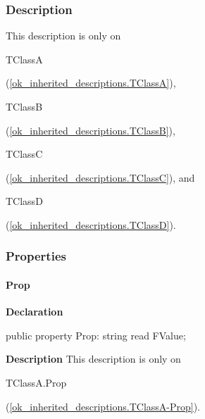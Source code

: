 \documentclass{report}
\begin{document}
\subsubsection*{\large{\textbf{Description}}\normalsize\hspace{1ex}\hfill}
This description is only on \begin{ttfamily}TClassA\end{ttfamily}(\ref{ok_inherited_descriptions.TClassA}), \begin{ttfamily}TClassB\end{ttfamily}(\ref{ok_inherited_descriptions.TClassB}), \begin{ttfamily}TClassC\end{ttfamily}(\ref{ok_inherited_descriptions.TClassC}), and \begin{ttfamily}TClassD\end{ttfamily}(\ref{ok_inherited_descriptions.TClassD}).\subsubsection*{\large{\textbf{Properties}}\normalsize\hspace{1ex}\hfill}
\paragraph*{Prop}\hspace*{\fill}

\begin{list}{}{
\setlength{\itemindent}{0cm}
\setlength{\listparindent}{0cm}
\setlength{\leftmargin}{\evensidemargin}
\addtolength{\leftmargin}{\tmplength}
\settowidth{\labelsep}{X}
\addtolength{\leftmargin}{\labelsep}
\setlength{\labelwidth}{\tmplength}
}
\begin{flushleft}
\item[\textbf{Declaration}\hfill]
\begin{ttfamily}
public property Prop: string read FValue;\end{ttfamily}


\end{flushleft}
\par
\item[\textbf{Description}]
This description is only on \begin{ttfamily}TClassA.Prop\end{ttfamily}(\ref{ok_inherited_descriptions.TClassA-Prop}).

\end{list}
\end{document}
